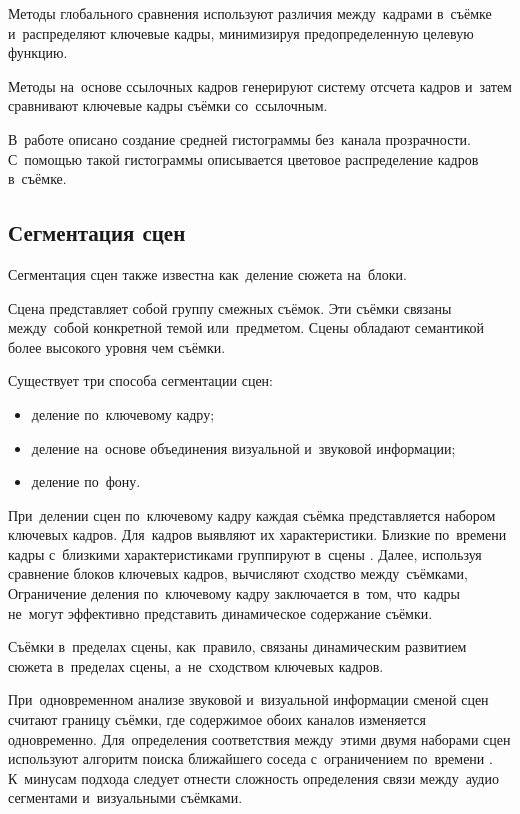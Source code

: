 Методы глобального сравнения используют различия между~кадрами
в~съёмке и~распределяют ключевые кадры,
минимизируя предопределенную целевую функцию.

Методы на~основе ссылочных кадров генерируют систему отсчета кадров
и~затем сравнивают ключевые кадры съёмки со~ссылочным.

В~работе \cite{Kazunori:2006} описано создание средней
гистограммы без~канала прозрачности.
С~помощью такой гистограммы описывается цветовое распределение кадров в~съёмке.


\subsection{Сегментация сцен}

Сегментация сцен также известна как~деление сюжета на~блоки.

Сцена представляет собой группу смежных съёмок.
Эти съёмки связаны между~собой конкретной темой или~предметом.
Сцены обладают семантикой более высокого уровня чем съёмки.

Существует три способа сегментации сцен:
\begin{itemize}
    \item деление по~ключевому кадру;
    \item деление на~основе объединения визуальной и~звуковой информации;
    \item деление по~фону.
\end{itemize}

При~делении сцен по~ключевому кадру каждая съёмка представляется набором
ключевых кадров. Для~кадров выявляют их характеристики.
Близкие по~времени кадры с~близкими
характеристиками группируют в~сцены \cite{Truong:2003}.
Далее, используя сравнение блоков ключевых кадров,
вычисляют сходство между~съёмками,
Ограничение деления по~ключевому кадру заключается в~том, что~кадры
не~могут эффективно представить динамическое содержание съёмки.

Съёмки в~пределах сцены, как~правило,
связаны динамическим развитием сюжета в~пределах сцены,
а~не~сходством ключевых кадров.


При~одновременном анализе звуковой и~визуальной информации сменой сцен считают
границу съёмки, где содержимое обоих каналов изменяется одновременно.
Для~определения соответствия между~этими двумя наборами сцен
используют алгоритм поиска ближайшего соседа
с~ограничением по~времени \cite{Sundaram:2000}.
К~минусам подхода следует отнести сложность
определения связи между~аудио сегментами и~визуальными съёмками.

